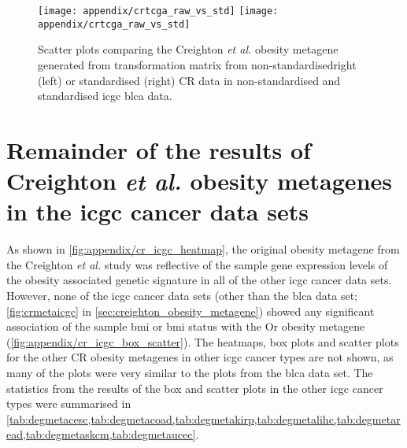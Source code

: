 \begin{appendices}
	\begin{figure}[h]
		\centering
		\texttt{[image: appendix/crtcga\_raw\_vs\_std]}
		\hfill
		\texttt{[image: appendix/crtcga\_raw\_vs\_std]}\\
		\caption{Scatter plots comparing the Creighton \textit{et al.} obesity metagene generated from transformation matrix from non-standardisedright (left) or standardised (right) CR data in non-standardised  and standardised  \gls{icgc} \gls{blca} data.}
		\label{fig:appendix/check_raw_vs_std_tm}
	\end{figure}

	\section{Remainder of the results of Creighton \textit{et al.} obesity metagenes in the \gls{icgc} cancer data sets}
	\label{sec:rest_of_the_cr_icgc_cancer_heatmap_results}

	As shown in \cref{fig:appendix/cr_icgc_heatmap}, the original obesity metagene from the Creighton \textit{et al.} study was reflective of the sample gene expression levels of the obesity associated genetic signature in all of the other \gls{icgc} cancer data sets.
	However, none of the \gls{icgc} cancer data sets (other than the \gls{blca} data set; \cref{fig:crmetaicgc} in \cref{sec:creighton_obesity_metagene}) showed any significant association of the sample \gls{bmi} or \gls{bmi} status with the Or obesity metagene (\cref{fig:appendix/cr_icgc_box_scatter}).
	The heatmaps, box plots and scatter plots for the other CR obesity metagenes in other \gls{icgc} cancer types are not shown, as many of the plots were very similar to the plots from the \gls{blca} data set.
	The statistics from the results of the box and scatter plots in the other \gls{icgc} cancer types were summarised in \cref{tab:degmetacesc,tab:degmetacoad,tab:degmetakirp,tab:degmetalihc,tab:degmetaread,tab:degmetaskcm,tab:degmetaucec}.


\end{appendices}
